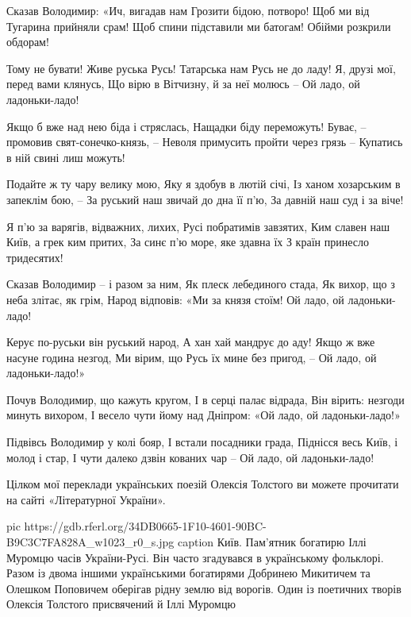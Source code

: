 \begin{multicols}{2}
        \obeycr
Сказав Володимир: «Ич, вигадав нам
Грозити бідою, потворо!
Щоб ми від Тугарина прийняли срам!
Щоб спини підставили ми батогам!
Обійми розкрили обдорам!

Тому не бувати! Живе руська Русь!
Татарська нам Русь не до ладу!
Я, друзі мої, перед вами клянусь,
Що вірю в Вітчизну, й за неї молюсь –
Ой ладо, ой ладоньки-ладо!

Якщо б вже над нею біда і стряслась,
Нащадки біду переможуть!
Буває, – промовив свят-сонечко-князь, –
Неволя примусить пройти через грязь –
Купатись в ній свині лиш можуть!

Подайте ж ту чару велику мою,
Яку я здобув в лютій січі,
Із ханом хозарським в запеклім бою, –
За руський наш звичай до дна її п’ю,
За давній наш суд і за віче!

Я п’ю за варягів, відважних, лихих,
Русі побратимів завзятих,
Ким славен наш Київ, а грек ким притих,
За синє п’ю море, яке здавна їх
З країн принесло тридесятих!

Сказав Володимир – і разом за ним,
Як плеск лебединого стада,
Як вихор, що з неба злітає, як грім,
Народ відповів: «Ми за князя стоїм!
Ой ладо, ой ладоньки-ладо!

Керує по-руськи він руський народ,
А хан хай мандрує до аду!
Якщо ж вже насуне година незгод,
Ми вірим, що Русь їх мине без пригод, –
Ой ладо, ой ладоньки-ладо!»

Почув Володимир, що кажуть кругом,
І в серці палає відрада,
Він вірить: незгоди минуть вихором,
І весело чути йому над Дніпром:
«Ой ладо, ой ладоньки-ладо!»

Підвівсь Володимир у колі бояр,
І встали посадники града,
Піднісся весь Київ, і молод і стар,
І чути далеко дзвін кованих чар –
Ой ладо, ой ладоньки-ладо!
        \restorecr
\end{multicols}

Цілком мої переклади українських поезій Олексія Толстого ви можете прочитати на
сайті «Літературної України».

\ifcmt
pic https://gdb.rferl.org/34DB0665-1F10-4601-90BC-B9C3C7FA828A_w1023_r0_s.jpg
caption Київ. Пам'ятник богатирю Іллі Муромцю часів України-Русі. Він часто згадувався в українському фольклорі. Разом із двома іншими українськими богатирями Добринею Микитичем та Олешком Поповичем оберігав рідну землю від ворогів. Один із поетичних творів Олексія Толстого присвячений й Іллі Муромцю
\fi
